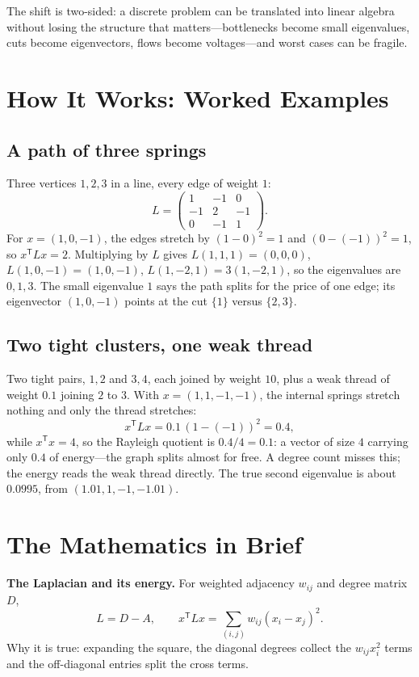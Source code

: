 The shift is two-sided: a discrete problem can be translated into linear algebra without losing the structure that matters---bottlenecks become small eigenvalues, cuts become eigenvectors, flows become voltages---and worst cases can be fragile.

\section{How It Works: Worked Examples}
\subsection{A path of three springs}
Three vertices $1,2,3$ in a line, every edge of weight $1$:
\[
L=\begin{pmatrix}1&-1&0\\-1&2&-1\\0&-1&1\end{pmatrix}.
\]
For $x=(1,0,-1)$, the edges stretch by $(1-0)^2=1$ and $(0-(-1))^2=1$, so $x^{\mathsf T}Lx=2$. Multiplying by $L$ gives $L(1,1,1)=(0,0,0)$, $L(1,0,-1)=(1,0,-1)$, $L(1,-2,1)=3(1,-2,1)$, so the eigenvalues are $0,1,3$. The small eigenvalue $1$ says the path splits for the price of one edge; its eigenvector $(1,0,-1)$ points at the cut $\{1\}$ versus $\{2,3\}$.

\subsection{Two tight clusters, one weak thread}
Two tight pairs, $1,2$ and $3,4$, each joined by weight $10$, plus a weak thread of weight $0.1$ joining $2$ to $3$. With $x=(1,1,-1,-1)$, the internal springs stretch nothing and only the thread stretches:
\[
x^{\mathsf T}Lx=0.1\,(1-(-1))^2=0.4,
\]
while $x^{\mathsf T}x=4$, so the Rayleigh quotient is $0.4/4=0.1$: a vector of size $4$ carrying only $0.4$ of energy---the graph splits almost for free. A degree count misses this; the energy reads the weak thread directly. The true second eigenvalue is about $0.0995$, from $(1.01,1,-1,-1.01)$.

\section{The Mathematics in Brief}
\noindent\textbf{The Laplacian and its energy.} For weighted adjacency $w_{ij}$ and degree matrix $D$,
\[
L=D-A,\qquad x^{\mathsf T}Lx=\sum_{(i,j)}w_{ij}(x_i-x_j)^2.
\]
Why it is true: expanding the square, the diagonal degrees collect the $w_{ij}x_i^2$ terms and the off-diagonal entries split the cross terms.

